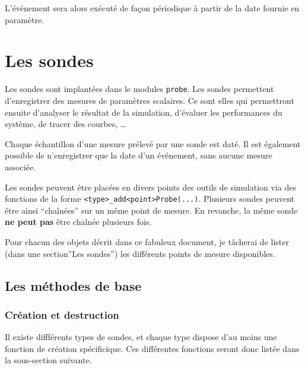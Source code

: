 \documentclass{article}
\begin{document}
   L'événement sera alors exécuté de façon périodique à partir de la
date fournie en paramètre.

%
\section{Les sondes}
\label{section:sondes}

   Les sondes sont implantées dans le modules {\tt probe}. Les sondes
permettent d'enregistrer des mesures de paramètres scalaires. Ce sont
elles qui permettront ensuite d'analyser le résultat de la simulation,
d'évaluer les performances du système, de tracer des courbes, \ldots

   Chaque échantillon d'une mesure prélevé par une sonde est daté. Il
est également possible de n'enregistrer que la date d'un événement,
sans aucune mesure associée.

   Les sondes peuvent être placées en divers points des outils de
simulation via des fonctions de la forme
\lstinline!<type>_add<point>Probe(...)!. Plusieurs sondes peuvent être
ainsi ``chaînées'' sur un même point de mesure. En revanche, la même
sonde {\bf ne peut pas} être chaînée plusieurs fois.

   Pour chacun des objets décrit dans ce fabuleux document, je
tâcherai de lister (dans une section''Les sondes'') les différents
points de mesure disponibles.

%
\subsection{Les méthodes de base}

%
\subsubsection{Création et destruction}

   Il existe diffférents types de sondes, et chaque type dispose d'au
moins une fonction de création spécificique. Ces différentes fonctions
seront donc listée dans la sous-section suivante.
\end{document}
